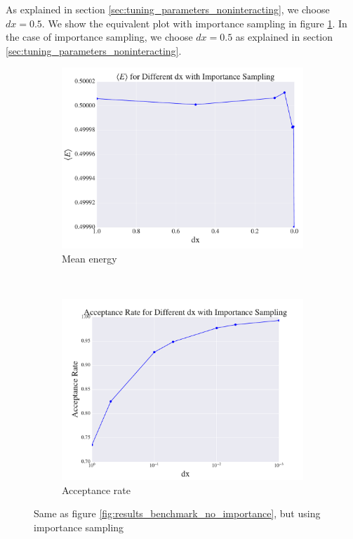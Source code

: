 \documentclass[a4paper, 10pt]{article}
\begin{document}
\linebreak
As explained in section \ref{sec:tuning_parameters_noninteracting}, we choose $dx=0.5$. We show the equivalent plot with importance sampling in figure \ref{fig:results_benchmark_importance}. In the case of importance sampling, we choose $dx=0.5$ as explained in section \ref{sec:tuning_parameters_noninteracting}.
\begin{figure}[ht!]
	\centering
	\begin{subfigure}[b]{0.8\textwidth}
		\centering
		\includegraphics[width=\textwidth]{../Results/E_v_dx_importance.pdf}
		\caption{Mean energy}
	\end{subfigure}
	~
	\begin{subfigure}[b]{0.8\textwidth}
		\centering
		\includegraphics[width=\textwidth]{../Results/AC_importance.pdf}
		\caption{Acceptance rate}
	\end{subfigure}
	\caption{Same as figure \ref{fig:results_benchmark_no_importance}, but using importance sampling}\label{fig:results_benchmark_importance}
\end{figure}
\end{document}
